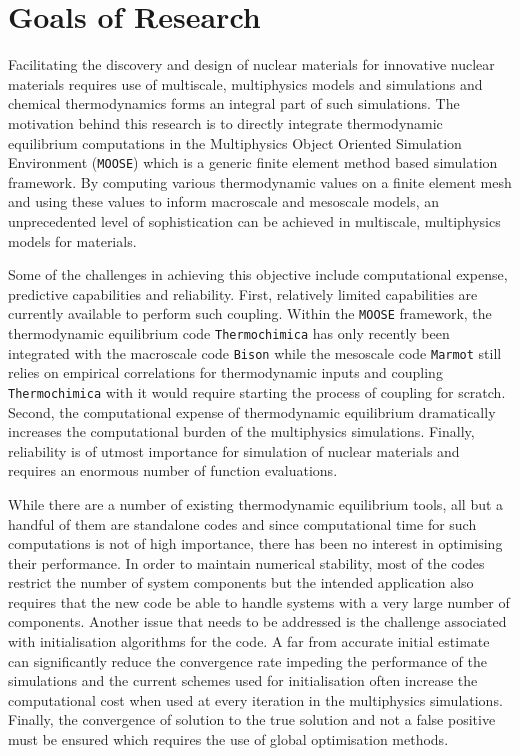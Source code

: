 \chapter{Goals of Research} \label{chapter_2}

	Facilitating the discovery and design of nuclear materials for innovative nuclear materials requires use of multiscale, multiphysics models and simulations and chemical thermodynamics forms an integral part of such simulations. The motivation behind this research is to directly integrate thermodynamic equilibrium computations in the Multiphysics Object Oriented Simulation Environment (\texttt{MOOSE}) which is a generic finite element method based simulation framework. By computing various thermodynamic values on a finite element mesh and using these values to inform macroscale and mesoscale models, an unprecedented level of sophistication can be achieved in multiscale, multiphysics models for materials.  

	Some of the challenges in achieving this objective include computational expense, predictive capabilities and reliability. First, relatively limited capabilities are currently available to perform such coupling. Within the \texttt{MOOSE} framework, the thermodynamic equilibrium code \texttt{Thermochimica} has only recently been integrated with the macroscale code \texttt{Bison} while the mesoscale code \texttt{Marmot} still relies on empirical correlations for thermodynamic inputs and coupling \texttt{Thermochimica} with it would require starting the process of coupling for scratch.  Second, the computational expense of thermodynamic equilibrium dramatically increases the computational burden of the multiphysics simulations. Finally, reliability is of utmost importance for simulation of nuclear materials and requires an enormous number of function evaluations. 
	
	While there are a number of existing thermodynamic equilibrium tools, all but a handful of them are standalone codes and since computational time for such computations is not of high importance, there has been no interest in optimising their performance. In order to maintain numerical stability, most of the codes restrict the number of system components but the intended application also requires that the new code be able to handle systems with a very large number of components. Another issue that needs to be addressed is the challenge associated with initialisation algorithms for the code. A far from accurate initial estimate can significantly reduce the convergence rate impeding the performance of the simulations and the current schemes used for initialisation often increase the computational cost when used at every iteration in the multiphysics simulations. Finally, the convergence of solution to the true solution and not a false positive must be ensured which requires the use of global optimisation methods. 
  
